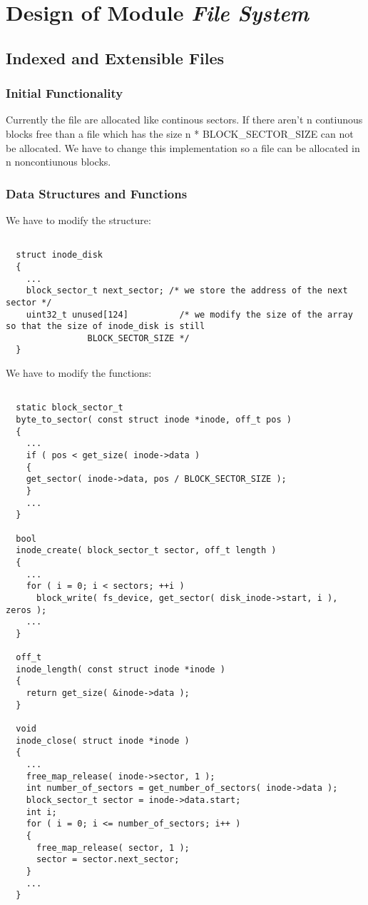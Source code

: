 \chapter{Design of Module \textit{File System}}


\section{Indexed and Extensible Files}
\subsection{Initial Functionality}
  
Currently the file are allocated like continous sectors. If there aren't n contiunous blocks free than a 
file which has the size n * BLOCK_SECTOR_SIZE can not be allocated. We have to change this implementation
so a file can be allocated in n noncontiunous blocks.

\subsection{Data Structures and Functions}

We have to modify the structure:

\begin{lstlisting}

  struct inode_disk
  {
    ...
    block_sector_t next_sector; /* we store the address of the next sector */
    uint32_t unused[124]	      /* we modify the size of the array so that the size of inode_disk is still 
				BLOCK_SECTOR_SIZE */
  }

\end{lstlisting}

We have to modify the functions:
\begin{lstlisting}
 
  static block_sector_t
  byte_to_sector( const struct inode *inode, off_t pos )
  {
    ...
    if ( pos < get_size( inode->data )
    {
	get_sector( inode->data, pos / BLOCK_SECTOR_SIZE ); 
    }
    ...
  }

  bool
  inode_create( block_sector_t sector, off_t length )
  {
    ...
    for ( i = 0; i < sectors; ++i )
      block_write( fs_device, get_sector( disk_inode->start, i ), zeros );
    ...
  }

  off_t
  inode_length( const struct inode *inode )
  {
    return get_size( &inode->data );
  }

  void
  inode_close( struct inode *inode )
  {
    ...
    free_map_release( inode->sector, 1 );
    int number_of_sectors = get_number_of_sectors( inode->data );
    block_sector_t sector = inode->data.start;
    int i;
    for ( i = 0; i <= number_of_sectors; i++ )
    {
      free_map_release( sector, 1 );
      sector = sector.next_sector;
    }
    ...
  }

\end{lstlisting}


